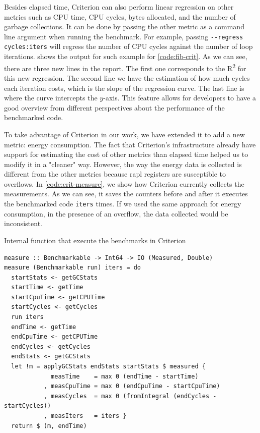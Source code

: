 Besides elapsed time, Criterion can also perform linear regression on other metrics such as CPU time, CPU cycles, bytes allocated, and the number of garbage collections. It can be done by passing the other metric as a command line argument when running the benchmark. For example, passing \texttt{-{}-regress cycles:iters} will regress the number of CPU cycles against the number of loop iterations.  shows the output for such example for \autoref{code:fib-crit}. As we can see, there are three new lines in the report. The first one corresponds to the R\textsuperscript{2} for this new regression. The second line we have the estimation of how much cycles each iteration costs, which is the slope of the regression curve. The last line is where the curve intercepts the $y$-axis. This feature allows for developers to have a good overview from different perspectives about the performance of the benchmarked code.

To take advantage of Criterion in our work, we have extended it to add a new metric: energy consumption. The fact that Criterion's infrastructure already have support for estimating the cost of other metrics than elapsed time helped us to modify it in a "cleaner" way. However, the way the energy data is collected is different from the other metrics because \ac{rapl} registers are susceptible to overflows. In \autoref{code:crit-measure}, we show how Criterion currently collects the measurements. As we can see, it saves the counters before and after it executes the benchmarked code \texttt{iters} times. If we used the same approach for energy consumption, in the presence of an overflow, the data collected would be inconsistent.

\begin{listing}
  \caption{Internal function that execute the benchmarks in Criterion}
  \begin{verbatim}
measure :: Benchmarkable -> Int64 -> IO (Measured, Double)
measure (Benchmarkable run) iters = do
  startStats <- getGCStats
  startTime <- getTime
  startCpuTime <- getCPUTime
  startCycles <- getCycles
  run iters
  endTime <- getTime
  endCpuTime <- getCPUTime
  endCycles <- getCycles
  endStats <- getGCStats
  let !m = applyGCStats endStats startStats $ measured {
             measTime    = max 0 (endTime - startTime)
           , measCpuTime = max 0 (endCpuTime - startCpuTime)
           , measCycles  = max 0 (fromIntegral (endCycles - startCycles))
           , measIters   = iters }
  return $ (m, endTime)
  \end{verbatim}
  \label{code:crit-measure}
\end{listing}

